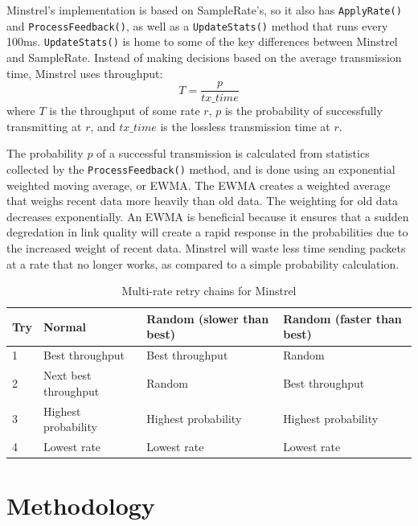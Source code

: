 \documentclass[letterpaper,twocolumn,10pt]{article}
\begin{document}
Minstrel's implementation is based on SampleRate's, so it also has \texttt{ApplyRate()} and \texttt{ProcessFeedback()}, as well as a \texttt{UpdateStats()} method that runs every 100ms. \texttt{UpdateStats()} is home to some of the key differences between Minstrel and SampleRate. Instead of making decisions based on the average 
transmission time, Minstrel uses throughput: \begin{equation} T = \frac{p}{tx\_time}\end{equation} where $T$ is the throughput of some rate $r$, $p$ is the probability of successfully transmitting at $r$, and $tx\_time$ is the lossless transmission time at $r$.

The probability $p$ of a successful transmission is calculated from statistics collected by the \texttt{ProcessFeedback()} method, and is done using an exponential weighted moving average, or EWMA. The EWMA creates a weighted average that weighs recent data more heavily than old data. The weighting for old data decreases exponentially. An EWMA is beneficial because it ensures that a sudden degredation in link quality will create a rapid response in the probabilities due to the increased weight of recent data. Minstrel will waste less time sending packets at a rate that no longer works, as compared to a simple probability calculation.

\begin{table}[htb]
    \begin{tabular}[htb]{l|l|l|l}
    Try & Normal               & Random (slower than best) & Random (faster than best) \\ \hline
    1   & Best throughput      & Best throughput           & Random                    \\
    2   & Next best throughput & Random                    & Best throughput           \\
    3   & Highest probability  & Highest probability       & Highest probability       \\
    4   & Lowest rate          & Lowest rate               & Lowest rate               \\
    \end{tabular}
    \caption{Multi-rate retry chains for Minstrel}
\label{table:1}
\end{table}

\section{Methodology}
\end{document}
